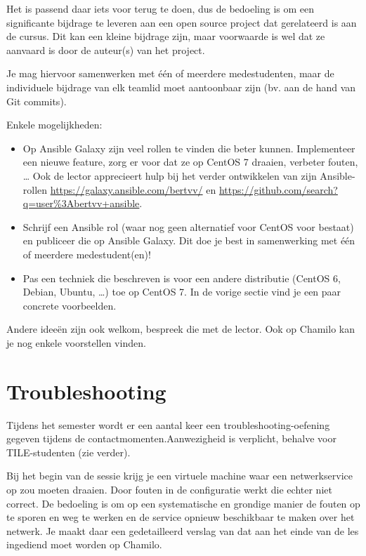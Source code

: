 Het is passend daar iets voor terug te doen, dus de bedoeling is om een
significante bijdrage te leveren aan een open source project dat
gerelateerd is aan de cursus. Dit kan een kleine bijdrage zijn, maar
voorwaarde is wel dat ze aanvaard is door de auteur(s) van het project.

Je mag hiervoor samenwerken met één of meerdere medestudenten, maar de
individuele bijdrage van elk teamlid moet aantoonbaar zijn (bv. aan de
hand van Git commits).

Enkele mogelijkheden:

\begin{itemize}
\item
  Op Ansible Galaxy zijn veel rollen te vinden die beter kunnen.
  Implementeer een nieuwe feature, zorg er voor dat ze op CentOS 7
  draaien, verbeter fouten, \ldots{} Ook de lector apprecieert hulp bij
  het verder ontwikkelen van zijn Ansible-rollen
  \url{https://galaxy.ansible.com/bertvv/} en
  \url{https://github.com/search?q=user\%3Abertvv+ansible}.
\item
  Schrijf een Ansible rol (waar nog geen alternatief voor CentOS voor
  bestaat) en publiceer die op Ansible Galaxy. Dit doe je best in
  samenwerking met één of meerdere medestudent(en)!
\item
  Pas een techniek die beschreven is voor een andere distributie (CentOS
  6, Debian, Ubuntu, \ldots{}) toe op CentOS 7. In de vorige sectie vind
  je een paar concrete voorbeelden.
\end{itemize}

Andere ideeën zijn ook welkom, bespreek die met de lector. Ook op
Chamilo kan je nog enkele voorstellen vinden.

\section{Troubleshooting}\label{troubleshooting}

Tijdens het semester wordt er een aantal keer een
troubleshooting-oefening gegeven tijdens de contactmomenten.Aanwezigheid
is verplicht, behalve voor TILE-studenten (zie verder).

Bij het begin van de sessie krijg je een virtuele machine waar een
netwerkservice op zou moeten draaien. Door fouten in de configuratie
werkt die echter niet correct. De bedoeling is om op een systematische
en grondige manier de fouten op te sporen en weg te werken en de service
opnieuw beschikbaar te maken over het netwerk. Je maakt daar een
gedetailleerd verslag van dat aan het einde van de les ingediend moet
worden op Chamilo.


